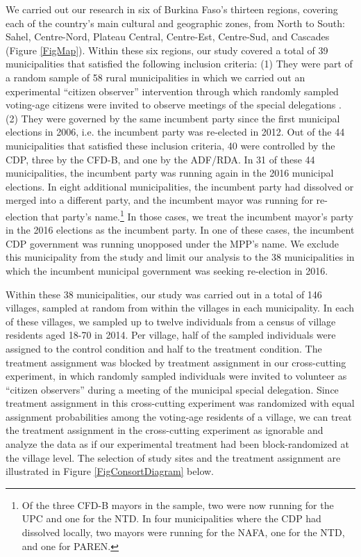 \documentclass[11pt]{article}
\begin{document}
We carried out our research in six of Burkina Faso's thirteen regions, covering each of the country's main cultural and geographic zones, from North to South: Sahel, Centre-Nord, Plateau Central, Centre-Est, Centre-Sud, and Cascades (Figure \ref{FigMap}). Within these six regions, our study covered a total of 39 municipalities that satisfied the following inclusion criteria: (1) They were part of a random sample of 58 rural municipalities in which we carried out an experimental ``citizen observer'' intervention through which randomly sampled voting-age citizens were invited to observe meetings of the special delegations \citep{CitizenObserverPAP}. (2) They were governed by the same incumbent party since the first municipal elections in 2006, i.e. the incumbent party was re-elected in 2012. Out of the 44 municipalities that satisfied these inclusion criteria, 40 were controlled by the CDP, three by the CFD-B, and one by the ADF/RDA. In 31 of these 44 municipalities, the incumbent party was running again in the 2016 municipal elections. In eight additional municipalities, the incumbent party had dissolved or merged into a different party, and the incumbent mayor was running for re-election that party's name.\footnote{Of the three CFD-B mayors in the sample, two were now running for the UPC and one for the NTD. In four municipalities where the CDP had dissolved locally, two mayors were running for the NAFA, one for the NTD, and one for PAREN.}  In those cases, we treat the incumbent mayor's party in the 2016 elections as the incumbent party. In one of these cases, the incumbent CDP government was running unopposed under the MPP's name. We exclude this municipality from the study and limit our analysis to the 38 municipalities in which the incumbent municipal government was seeking re-election in 2016. 

Within these 38 municipalities, our study was carried out in a total of 146 villages, sampled at random from within the villages in each municipality. In each of these villages, we sampled up to twelve individuals from a census of village residents aged 18-70 in 2014. Per village, half of the sampled individuals were assigned to the control condition and half to the treatment condition. The treatment assignment was blocked by treatment assignment in our cross-cutting experiment, in which randomly sampled individuals were invited to volunteer as ``citizen observers'' during a meeting of the municipal special delegation. Since treatment assignment in this cross-cutting experiment was randomized with equal assignment probabilities among the voting-age residents of a village, we can treat the treatment assignment in the cross-cutting experiment as ignorable and analyze the data as if our experimental treatment had been block-randomized at the village level. The selection of study sites and the treatment assignment are illustrated in Figure \ref{FigConsortDiagram} below. 
\end{document}

